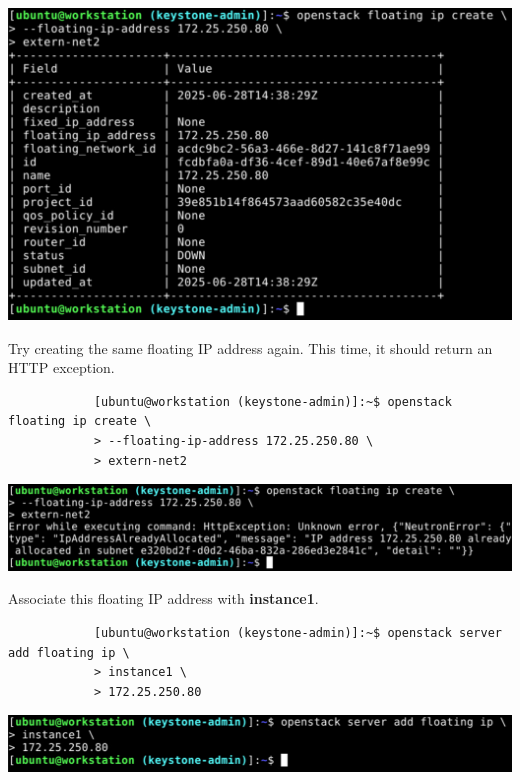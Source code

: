 \documentclass[letterpaper, 12pt]{article}
\begin{document}
\begin{enumerate}
\begin{labstep}
        \begin{center}
            \includegraphics[width=\linewidth]{images/part3/step16.png}
        \end{center}
    \end{labstep}

    \begin{labstep}
        Try creating the same floating IP address again.
        This time, it should return an HTTP exception.
        \begin{lstlisting}
            [ubuntu@workstation (keystone-admin)]:~$ openstack floating ip create \
            > --floating-ip-address 172.25.250.80 \
            > extern-net2
        \end{lstlisting}

        \begin{center}
            \includegraphics[width=\linewidth]{images/part3/step17.png}
        \end{center}
    \end{labstep}

    \begin{labstep}
        Associate this floating IP address with \textbf{instance1}.
        \begin{lstlisting}
            [ubuntu@workstation (keystone-admin)]:~$ openstack server add floating ip \
            > instance1 \
            > 172.25.250.80
        \end{lstlisting}

        \begin{center}
            \includegraphics[width=\linewidth]{images/part3/step18.png}
        \end{center}
    \end{labstep}


\end{enumerate}
\end{document}
